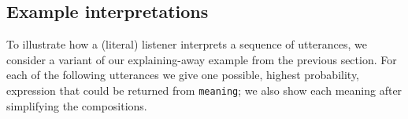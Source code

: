 \documentclass[pdfextras]{handbook}
\newcommand{\llbracket}{\ensuremath{\left [\!\left [}}%
\newcommand{\rrbracket}{\ensuremath{\right ]\!\right ]}}
\providecommand{\sv}[1]{\ensuremath{\llbracket \mathit{#1} \rrbracket}}
\begin{document}
%
%
%

\subsection{Example interpretations}

To illustrate how a (literal) listener interprets a sequence of utterances, we consider a variant of our explaining-away example from the previous section. 
For each of the following utterances we give one possible, highest probability, expression that could be returned from \lstinline{meaning}; we also show each meaning after simplifying the compositions.
\end{document}
